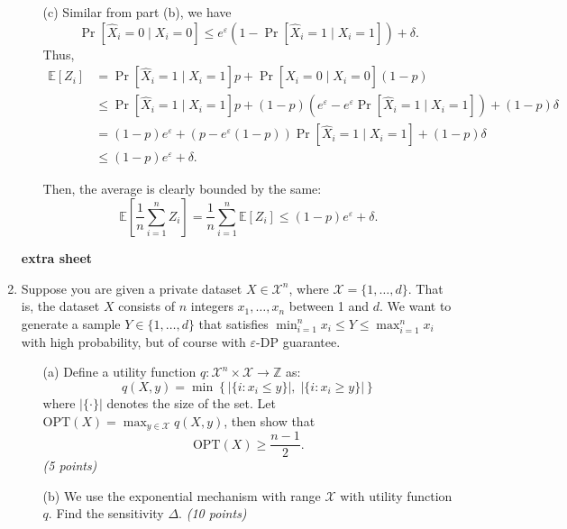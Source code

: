 \documentclass[12pt]{article}
\begin{document}
\begin{enumerate}
\begin{solution}
\begin{enumerate}
\item[(c)] Similar from part (b), we have
\[
\Pr[\hat{X}_i = 0 \mid X_i = 0] \leq e^{\varepsilon}(1 - \Pr[\hat{X}_i = 1 \mid X_i = 1]) + \delta.
\]
Thus,
\begin{align*}
\mathbb{E}[Z_i] 
&= \Pr[\hat{X}_i = 1 \mid X_i = 1]p + \Pr[\hat{X}_i = 0 \mid X_i = 0](1 - p) \\
&\leq \Pr[\hat{X}_i = 1 \mid X_i = 1]p + (1 - p)(e^{\varepsilon} - e^{\varepsilon} \Pr[\hat{X}_i = 1 \mid X_i = 1]) + (1 - p)\delta \\
&= (1 - p)e^{\varepsilon} + (p - e^{\varepsilon}(1 - p)) \Pr[\hat{X}_i = 1 \mid X_i = 1] + (1 - p)\delta \\
&\leq (1 - p)e^{\varepsilon} + \delta.
\end{align*}

Then, the average is clearly bounded by the same:
\[
\mathbb{E}\left[\frac{1}{n} \sum_{i=1}^n Z_i\right] = \frac{1}{n} \sum_{i=1}^n \mathbb{E}[Z_i] \leq (1 - p)e^{\varepsilon} + \delta.
\]
\end{enumerate}

\end{solution}

\begin{problem}
    \newpage
    {\bf extra sheet}
    \newpage
\end{problem}

\item Suppose you are given a private dataset $X \in \mathcal{X}^n$, where $\mathcal{X} = \{1, \dots, d\}$. That is, the dataset $X$ consists of $n$ integers $x_1, \dots, x_n$ between 1 and $d$. We want to generate a sample $Y \in \{1, \dots, d\}$ that satisfies $\min_{i=1}^n x_i \leq Y \leq \max_{i=1}^n x_i$ with high probability, but of course with $\varepsilon$-DP guarantee.

\begin{enumerate}
    \item[(a)] Define a utility function $q : \mathcal{X}^n \times \mathcal{X} \rightarrow \mathbb{Z}$ as:
    \[
    q(X, y) = \min \left\{ |\{i : x_i \leq y\}|, \; |\{i : x_i \geq y\}| \right\}
    \]
    where $|\{\cdot\}|$ denotes the size of the set. Let $\text{OPT}(X) = \max_{y \in \mathcal{X}} q(X, y)$, then show that
    \[
    \text{OPT}(X) \geq \frac{n - 1}{2}.
    \]
    \textit{(5 points)}

    \item[(b)] We use the exponential mechanism with range $\mathcal{X}$ with utility function $q$. Find the sensitivity $\Delta$. \textit{(10 points)}


\end{enumerate}
\end{enumerate}
\end{document}
